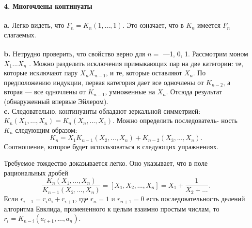 \noindent\textbf{4. Многочлены континуаты}\\
\\
\hspace*{15pt}\textbf{a.} Легко видеть, что $F_n=K_n(1,...,1)$. Это означает, что в $K_n$\linebreak
имеется $F_n$ слагаемых.\\
\\
\hspace*{15pt}\textbf{b.} Нетрудно проверить, что свойство верно для $n=$ —1, 0, 1.\linebreak
Рассмотрим моном $X_1...X_n$ . Можно разделить исключения примыкающих\linebreak
пар на две категории: те, которые исключают пару $X_nX_{n-1}$, и те,\linebreak
которые оставляют $X_n$. По предположению индукции, первая категория\linebreak
дает все одночлены от $K_{n-2}$, а вторая — все одночлены от $K_{n-1}$,\linebreak
умноженные на $X_n$. Отсюда результат (обнаруженный впервые Эйлером).\linebreak
\\
\hspace*{15pt}\textbf{c.} Следовательно, континуанты обладают зеркальной симметрией:\linebreak
$K_n(X_1,...,X_n)=K_n(X_n,...,X_1)$. Можно определить последователь­-\linebreak
ность $K_n$ следующим образом:
$$K_n=X_1K_{n-1}(X_2,...,X_n)+K_{n-2}(X_3,...,X_n).$$
Соотношение, которое будет использоваться в следующих упражне­ниях.\newpage

Требуемое тождество доказывается легко. Оно указывает, что в\linebreak
по­ле рациональных дробей
$$ \frac{K_n(X_1,...,X_n)}{K_{n-1}(X_2,...,X_n)}=[X_1,X_2,...,X_n]=X_1+\frac{1}{X_2+...}.$$
Если $r_{i-1}=r_ia_i+r_{i+1}$, где $r_n=1$ и $r_{n+1}=0$ есть последовательность\linebreak
делений алгоритма Евклида, примененного к целым взаимно простым\linebreak
числам, то $r_i=K_{n-i}(a_{i+1},...,a_n)$.\newline
\\

